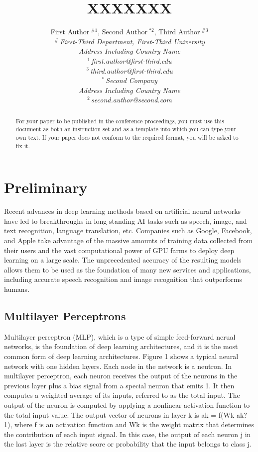 \documentclass[10pt,conference,letterpaper]{IEEEtran}
\title{XXXXXXX}
\author{%
{First Author{\small $~^{\#1}$}, Second Author{\small $~^{*2}$}, Third Author{\small $~^{\#3}$} }%
\vspace{1.6mm}\\
\fontsize{10}{10}\selectfont\itshape
$^{\#}$\,First-Third Department, First-Third University\\
Address Including Country Name\\
\fontsize{9}{9}\selectfont\ttfamily\upshape
%
$^{1}$\,first.author@first-third.edu\\
$^{3}$\,third.author@first-third.edu%
\vspace{1.2mm}\\
\fontsize{10}{10}\selectfont\rmfamily\itshape
$^{*}$\,Second Company\\
Address Including Country Name\\
\fontsize{9}{9}\selectfont\ttfamily\upshape
$^{2}$\,second.author@second.com
}
\begin{document}
\maketitle
%
\begin{abstract} 
For your paper to be published in the conference proceedings, you must
use this document as both an instruction set and as a template into
which you can type your own text.  If your paper does not conform to
the required format, you will be asked to fix it.
\end{abstract}

%
\section{Preliminary}


Recent advances in deep learning methods based on artificial neural networks have led to breakthroughs in long-standing AI tasks such as speech, image, and text recognition, language translation, etc. Companies such as Google, Facebook, and Apple take advantage of the massive amounts of training data collected from their users and the vast computational power of GPU farms to deploy deep learning on a large scale. The unprecedented accuracy of the resulting models allows them to be used as the foundation of many new services and applications, including accurate speech recognition and image recognition that outperforms humans.

\subsection{Multilayer Perceptrons}
Multilayer perceptron (MLP), which is a type of simple feed-forward nerual networks, is the foundation of deep learning architectures, and it is the most common form of deep learning architectures. Figure 1 shows a typical neural network with one hidden layers. Each node in the network is a neutron. In multilayer perceptron, each neuron receives the output of the neurons in the previous layer plus a bias signal from a special neuron that emits 1. It then computes a weighted average of its inputs, referred to as the total input. The output of the neuron is computed by applying a nonlinear activation function to the total input value. The output vector of neurons in layer k is ak = f(Wk ak?1), where f is an activation function and Wk is the weight matrix that determines the contribution of each input signal. In this case, the output of each neuron j in the last layer is the relative score or probability that the
input belongs to class j.
\end{document}
